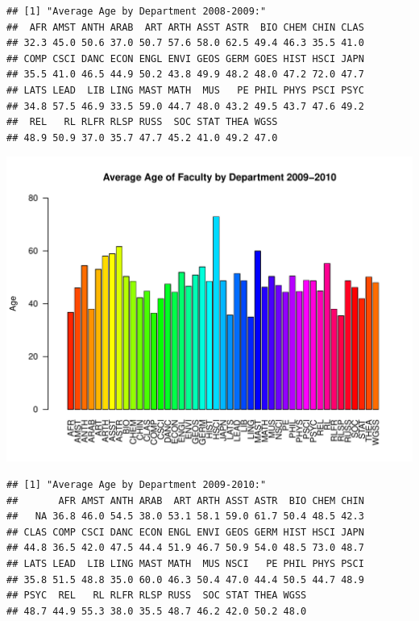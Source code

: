 \documentclass[12pt,a4paper]{article}\usepackage[]{graphicx}\usepackage[]{color}
\makeatletter
\def\maxwidth{ %
  \ifdim\Gin@nat@width>\linewidth
    \linewidth
  \else
    \Gin@nat@width
  \fi
}
\newenvironment{kframe}{%
 \def\at@end@of@kframe{}%
 \ifinner\ifhmode%
  \def\at@end@of@kframe{\end{minipage}}%
  \begin{minipage}{\columnwidth}%
 \fi\fi%
 \def\FrameCommand##1{\hskip\@totalleftmargin \hskip-\fboxsep
 \colorbox{shadecolor}{##1}\hskip-\fboxsep
     \hskip-\linewidth \hskip-\@totalleftmargin \hskip\columnwidth}%
 \MakeFramed {\advance\hsize-\width
   \@totalleftmargin\z@ \linewidth\hsize
   \@setminipage}}%
 {\par\unskip\endMakeFramed%
 \at@end@of@kframe}
\newenvironment{knitrout}{}{} %
\theoremstyle{definition}
\makeatother
\begin{document}
\begin{knitrout}
\begin{kframe}\begin{verbatim}
## [1] "Average Age by Department 2008-2009:"
##  AFR AMST ANTH ARAB  ART ARTH ASST ASTR  BIO CHEM CHIN CLAS 
## 32.3 45.0 50.6 37.0 50.7 57.6 58.0 62.5 49.4 46.3 35.5 41.0 
## COMP CSCI DANC ECON ENGL ENVI GEOS GERM GOES HIST HSCI JAPN 
## 35.5 41.0 46.5 44.9 50.2 43.8 49.9 48.2 48.0 47.2 72.0 47.7 
## LATS LEAD  LIB LING MAST MATH  MUS   PE PHIL PHYS PSCI PSYC 
## 34.8 57.5 46.9 33.5 59.0 44.7 48.0 43.2 49.5 43.7 47.6 49.2 
##  REL   RL RLFR RLSP RUSS  SOC STAT THEA WGSS 
## 48.9 50.9 37.0 35.7 47.7 45.2 41.0 49.2 47.0
\end{verbatim}
\end{kframe}
\includegraphics[width=\maxwidth]{figure/unnamed-chunk-9-6} 
\begin{kframe}\begin{verbatim}
## [1] "Average Age by Department 2009-2010:"
##       AFR AMST ANTH ARAB  ART ARTH ASST ASTR  BIO CHEM CHIN 
##   NA 36.8 46.0 54.5 38.0 53.1 58.1 59.0 61.7 50.4 48.5 42.3 
## CLAS COMP CSCI DANC ECON ENGL ENVI GEOS GERM HIST HSCI JAPN 
## 44.8 36.5 42.0 47.5 44.4 51.9 46.7 50.9 54.0 48.5 73.0 48.7 
## LATS LEAD  LIB LING MAST MATH  MUS NSCI   PE PHIL PHYS PSCI 
## 35.8 51.5 48.8 35.0 60.0 46.3 50.4 47.0 44.4 50.5 44.7 48.9 
## PSYC  REL   RL RLFR RLSP RUSS  SOC STAT THEA WGSS 
## 48.7 44.9 55.3 38.0 35.5 48.7 46.2 42.0 50.2 48.0
\end{verbatim}
\end{kframe}

\end{knitrout}
\end{document}
